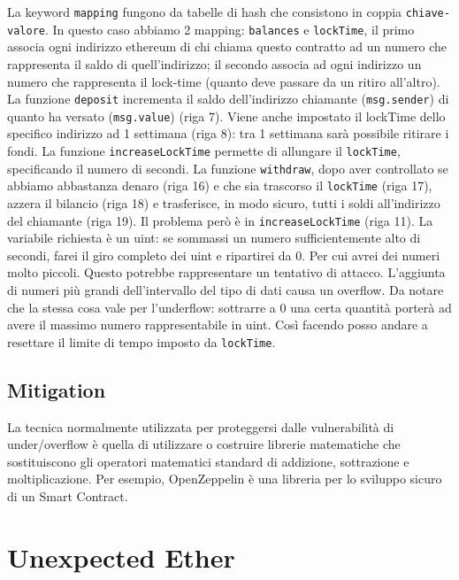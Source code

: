 La keyword \verb|mapping| fungono da tabelle di hash che consistono in coppia
\verb|chiave-valore|. In questo caso abbiamo 2 mapping: \verb|balances| e \verb|lockTime|,
il primo associa ogni indirizzo ethereum di chi chiama questo contratto ad un numero
che rappresenta il saldo di quell'indirizzo; il secondo associa ad ogni indirizzo
un numero che rappresenta il lock-time (quanto deve passare da un ritiro all'altro).
La funzione \verb|deposit| incrementa il saldo dell'indirizzo chiamante (\verb|msg.sender|)
di quanto ha versato (\verb|msg.value|) (riga 7). Viene anche impostato il lockTime
dello specifico indirizzo ad 1 settimana (riga 8): tra 1 settimana sarà possibile ritirare i fondi.
La funzione \verb|increaseLockTime| permette di allungare il \verb|lockTime|, specificando
il numero di secondi.
La funzione \verb|withdraw|, dopo aver controllato se abbiamo abbastanza denaro
(riga 16) e che sia trascorso il \verb|lockTime| (riga 17), azzera
il bilancio (riga 18)
e trasferisce, in modo sicuro, tutti i soldi all'indirizzo del chiamante (riga 19).
Il problema però è in \verb|increaseLockTime| (riga 11).
La variabile richiesta è un uint: se sommassi un
numero sufficientemente alto di secondi, farei il giro completo dei uint e
ripartirei da 0.
Per cui avrei dei numeri molto piccoli.
Questo potrebbe rappresentare un tentativo di attacco.
L'aggiunta di numeri più grandi dell'intervallo del tipo di dati causa un overflow.
Da notare che la stessa cosa vale per l'underflow: sottrarre a $0$ una certa
quantità porterà ad avere il massimo numero rappresentabile in uint.
Così facendo posso andare a resettare il limite di tempo imposto da \verb|lockTime|.

\subsection{Mitigation}

La tecnica normalmente utilizzata per proteggersi dalle vulnerabilità di
under/overflow è
quella di utilizzare o costruire librerie matematiche che sostituiscono gli
operatori matematici
standard di addizione, sottrazione e moltiplicazione.
Per esempio, OpenZeppelin è una
libreria per lo sviluppo sicuro di un Smart Contract.

\section{Unexpected Ether}

